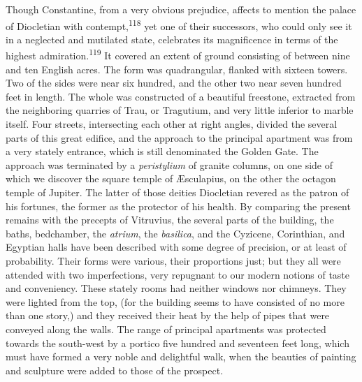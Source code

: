 


Though Constantine, from a very obvious prejudice, affects to
mention the palace of Diocletian with contempt,\textsuperscript{118} yet one of
their successors, who could only see it in a neglected and
mutilated state, celebrates its magnificence in terms of the
highest admiration.\textsuperscript{119} It covered an extent of ground consisting
of between nine and ten English acres. The form was quadrangular,
flanked with sixteen towers. Two of the sides were near six
hundred, and the other two near seven hundred feet in length. The
whole was constructed of a beautiful freestone, extracted from
the neighboring quarries of Trau, or Tragutium, and very little
inferior to marble itself. Four streets, intersecting each other
at right angles, divided the several parts of this great edifice,
and the approach to the principal apartment was from a very
stately entrance, which is still denominated the Golden Gate. The
approach was terminated by a \textit{peristylium} of granite columns, on
one side of which we discover the square temple of Æsculapius, on
the other the octagon temple of Jupiter. The latter of those
deities Diocletian revered as the patron of his fortunes, the
former as the protector of his health. By comparing the present
remains with the precepts of Vitruvius, the several parts of the
building, the baths, bedchamber, the \textit{atrium}, the \textit{basilica},
and the Cyzicene, Corinthian, and Egyptian halls have been
described with some degree of precision, or at least of
probability. Their forms were various, their proportions just;
but they all were attended with two imperfections, very repugnant
to our modern notions of taste and conveniency. These stately
rooms had neither windows nor chimneys. They were lighted from
the top, (for the building seems to have consisted of no more
than one story,) and they received their heat by the help of
pipes that were conveyed along the walls. The range of principal
apartments was protected towards the south-west by a portico five
hundred and seventeen feet long, which must have formed a very
noble and delightful walk, when the beauties of painting and
sculpture were added to those of the prospect.

